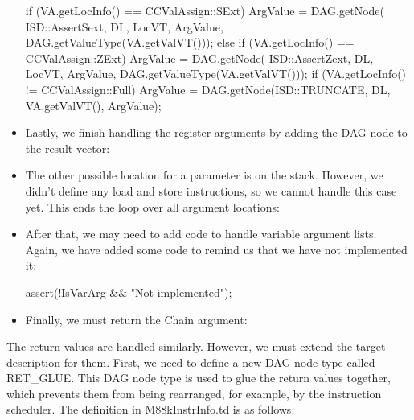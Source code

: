 \begin{itemize}
\begin{cpp}
            if (VA.getLocInfo() == CCValAssign::SExt)
                ArgValue = DAG.getNode(
                    ISD::AssertSext, DL, LocVT, ArgValue,
                    DAG.getValueType(VA.getValVT()));
            else if (VA.getLocInfo() == CCValAssign::ZExt)
                ArgValue = DAG.getNode(
                    ISD::AssertZext, DL, LocVT, ArgValue,
                    DAG.getValueType(VA.getValVT()));
            if (VA.getLocInfo() != CCValAssign::Full)
                ArgValue = DAG.getNode(ISD::TRUNCATE, DL,
                                        VA.getValVT(), ArgValue);
\end{cpp}

\item
Lastly, we finish handling the register arguments by adding the DAG node to the result vector:

\begin{cpp}
            InVals.push_back(ArgValue);
        }
\end{cpp}

\item
The other possible location for a parameter is on the stack. However, we didn’t define any load and store instructions, so we cannot handle this case yet. This ends the loop over all argument locations:

\begin{cpp}
        } else {
            llvm_unreachable("Not implemented");
        }
    }
\end{cpp}

\item
After that, we may need to add code to handle variable argument lists. Again, we have added some code to remind us that we have not implemented it:

\begin{cpp}
    assert(!IsVarArg && "Not implemented");
\end{cpp}

\item
Finally, we must return the Chain argument:

\begin{cpp}
    return Chain;
}
\end{cpp}
\end{itemize}


The return values are handled similarly. However, we must extend the target description for them. First, we need to define a new DAG node type called RET\_GLUE. This DAG node type is used to glue the return values together, which prevents them from being rearranged, for example, by the instruction scheduler. The definition in M88kInstrInfo.td is as follows:

